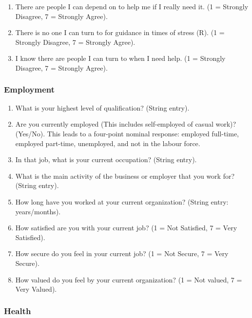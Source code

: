 \documentclass[
]{interact}
\providecommand{\tightlist}{%
  \setlength{\itemsep}{0pt}\setlength{\parskip}{0pt}}\usepackage{longtable,booktabs,array}
\begin{document}
\begin{enumerate}
\def\labelenumi{\arabic{enumi}.}
\tightlist
\item
  There are people I can depend on to help me if I really need it. (1 =
  Strongly Disagree, 7 = Strongly Agree).
\item
  There is no one I can turn to for guidance in times of stress (R). (1
  = Strongly Disagree, 7 = Strongly Agree).
\item
  I know there are people I can turn to when I need help. (1 = Strongly
  Disagree, 7 = Strongly Agree).
\end{enumerate}

\subsubsection{Employment}\label{employment}

\begin{enumerate}
\def\labelenumi{\arabic{enumi}.}
\tightlist
\item
  What is your highest level of qualification? (String entry).
\item
  Are you currently employed (This includes self-employed of casual
  work)? (Yes/No). This leads to a four-point nominal response: employed
  full-time, employed part-time, unemployed, and not in the labour
  force.
\item
  In that job, what is your current occupation? (String entry).
\item
  What is the main activity of the business or employer that you work
  for? (String entry).
\item
  How long have you worked at your current organization? (String entry:
  years/months).
\item
  How satisfied are you with your current job? (1 = Not Satisfied, 7 =
  Very Satisfied).
\item
  How secure do you feel in your current job? (1 = Not Secure, 7 = Very
  Secure).
\item
  How valued do you feel by your current organization? (1 = Not valued,
  7 = Very Valued).
\end{enumerate}

\subsubsection{Health}\label{health}
\end{document}
